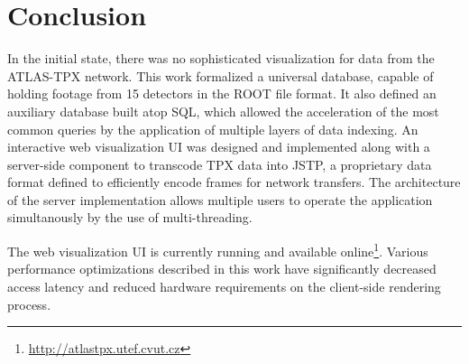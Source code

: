 \chapter{Conclusion}

In the initial state, there was no sophisticated visualization for data from the ATLAS-TPX network. This work formalized a universal database, capable of holding footage from 15 detectors in the ROOT file format. It also defined an auxiliary database built atop SQL, which allowed the acceleration of the most common queries by the application of multiple layers of data indexing. An interactive web visualization UI was designed and implemented along with a server-side component to transcode TPX data into JSTP, a proprietary data format defined to efficiently encode frames for network transfers. The architecture of the server implementation allows multiple users to operate the application simultanously by the use of multi-threading.

The web visualization UI is currently running and available online\footnote{\url{http://atlastpx.utef.cvut.cz}}. Various performance optimizations described in this work have significantly decreased access latency and reduced hardware requirements on the client-side rendering process.
